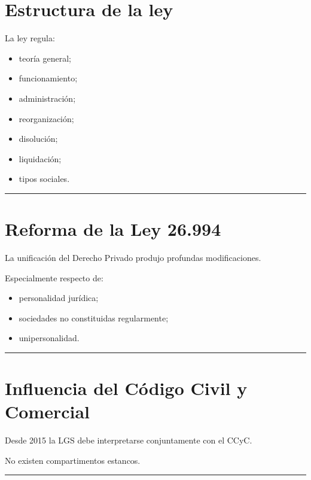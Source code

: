 \documentclass[
  spanish,
  letterpaper,
  DIV=11,
  numbers=noendperiod]{scrartcl}
\providecommand{\tightlist}{%
  \setlength{\itemsep}{0pt}\setlength{\parskip}{0pt}}
\begin{document}
\section{Estructura de la ley}\label{estructura-de-la-ley}

La ley regula:

\begin{itemize}
\tightlist
\item
  teoría general;
\item
  funcionamiento;
\item
  administración;
\item
  reorganización;
\item
  disolución;
\item
  liquidación;
\item
  tipos sociales.
\end{itemize}

\begin{center}\rule{0.5\linewidth}{0.5pt}\end{center}

\section{Reforma de la Ley 26.994}\label{reforma-de-la-ley-26.994}

La unificación del Derecho Privado produjo profundas modificaciones.

Especialmente respecto de:

\begin{itemize}
\tightlist
\item
  personalidad jurídica;
\item
  sociedades no constituidas regularmente;
\item
  unipersonalidad.
\end{itemize}

\begin{center}\rule{0.5\linewidth}{0.5pt}\end{center}

\section{Influencia del Código Civil y
Comercial}\label{influencia-del-cuxf3digo-civil-y-comercial}

Desde 2015 la LGS debe interpretarse conjuntamente con el CCyC.

No existen compartimentos estancos.

\begin{center}\rule{0.5\linewidth}{0.5pt}\end{center}
\end{document}
